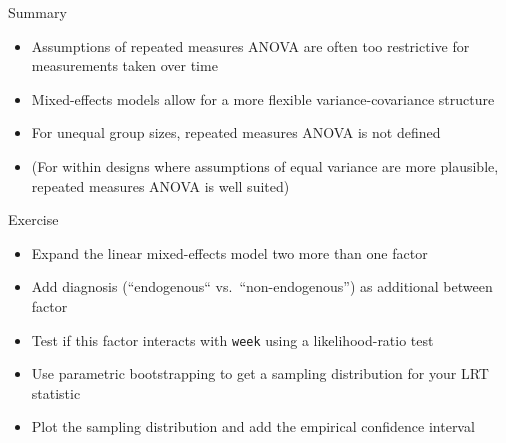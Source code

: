 \documentclass[aspectratio=169]{beamer}
\begin{document}
\begin{frame}[<+->]{Summary}
  \begin{itemize}
    \item Assumptions of repeated measures ANOVA are often too restrictive
      for measurements taken over time
    \item Mixed-effects models allow for a more flexible variance-covariance
      structure
    \item For unequal group sizes, repeated measures ANOVA is not defined
    \item (For within designs where assumptions of equal variance are more
      plausible, repeated measures ANOVA is well suited)
  \end{itemize}
  \vfill
\end{frame}

\begin{frame}[fragile]{}
  \begin{block}{Exercise}
    \begin{itemize}
      \item Expand the linear mixed-effects model two more than one factor
      \item Add diagnosis (``endogenous`` vs.\ ``non-endogenous'') as additional
        between factor
      \item Test if this factor interacts with \texttt{week} using a
        likelihood-ratio test
      \item Use parametric bootstrapping to get a sampling distribution for your
        LRT statistic
      \item Plot the sampling distribution and add the empirical confidence
        interval
    \end{itemize}
  \end{block}
\end{frame}

\appendix
\end{document}
